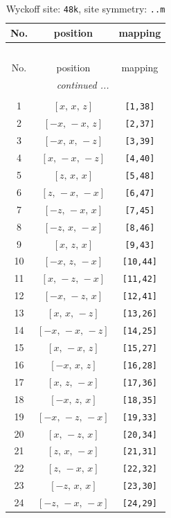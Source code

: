 \documentclass[fleqn,8pt]{jsarticle}
\begin{document}
\renewcommand{\arraystretch}{1.2}
\begin{longtable}{ccc}
\caption{Wyckoff site: {\tt 48k}, site symmetry: {\tt ..m}}
 \\
 \hline \hline
No. & position & mapping \\ \hline \endfirsthead

\multicolumn{2}{l}{\tablename\ \thetable{}} \\
 \hline \hline
No. & position & mapping \\ \hline \endhead

 \hline \hline
\multicolumn{2}{r}{\footnotesize\it continued ...} \\ \endfoot

 \hline \hline
\multicolumn{2}{r}{} \\ \endlastfoot

1 & $\left[ x,\, x,\, z \right]$ & {\tt [1,38]} \\ \hline
2 & $\left[ - x,\, - x,\, z \right]$ & {\tt [2,37]} \\ \hline
3 & $\left[ - x,\, x,\, - z \right]$ & {\tt [3,39]} \\ \hline
4 & $\left[ x,\, - x,\, - z \right]$ & {\tt [4,40]} \\ \hline
5 & $\left[ z,\, x,\, x \right]$ & {\tt [5,48]} \\ \hline
6 & $\left[ z,\, - x,\, - x \right]$ & {\tt [6,47]} \\ \hline
7 & $\left[ - z,\, - x,\, x \right]$ & {\tt [7,45]} \\ \hline
8 & $\left[ - z,\, x,\, - x \right]$ & {\tt [8,46]} \\ \hline
9 & $\left[ x,\, z,\, x \right]$ & {\tt [9,43]} \\ \hline
10 & $\left[ - x,\, z,\, - x \right]$ & {\tt [10,44]} \\ \hline
11 & $\left[ x,\, - z,\, - x \right]$ & {\tt [11,42]} \\ \hline
12 & $\left[ - x,\, - z,\, x \right]$ & {\tt [12,41]} \\ \hline
13 & $\left[ x,\, x,\, - z \right]$ & {\tt [13,26]} \\ \hline
14 & $\left[ - x,\, - x,\, - z \right]$ & {\tt [14,25]} \\ \hline
15 & $\left[ x,\, - x,\, z \right]$ & {\tt [15,27]} \\ \hline
16 & $\left[ - x,\, x,\, z \right]$ & {\tt [16,28]} \\ \hline
17 & $\left[ x,\, z,\, - x \right]$ & {\tt [17,36]} \\ \hline
18 & $\left[ - x,\, z,\, x \right]$ & {\tt [18,35]} \\ \hline
19 & $\left[ - x,\, - z,\, - x \right]$ & {\tt [19,33]} \\ \hline
20 & $\left[ x,\, - z,\, x \right]$ & {\tt [20,34]} \\ \hline
21 & $\left[ z,\, x,\, - x \right]$ & {\tt [21,31]} \\ \hline
22 & $\left[ z,\, - x,\, x \right]$ & {\tt [22,32]} \\ \hline
23 & $\left[ - z,\, x,\, x \right]$ & {\tt [23,30]} \\ \hline
24 & $\left[ - z,\, - x,\, - x \right]$ & {\tt [24,29]} \\
\end{longtable}
\end{document}
